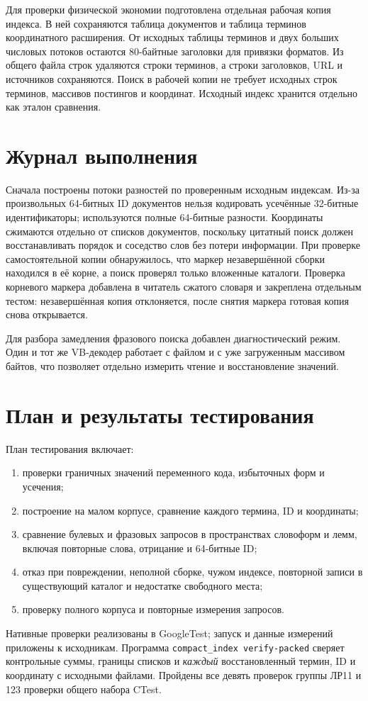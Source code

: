 \documentclass[12pt,a4paper]{article}
\begin{document}
Для проверки физической экономии подготовлена отдельная рабочая копия индекса.
В ней сохраняются таблица документов и таблица терминов координатного
расширения. От исходных таблицы терминов и двух больших числовых потоков
остаются 80-байтные заголовки для привязки форматов. Из общего файла строк
удаляются строки терминов, а строки заголовков, URL и источников сохраняются.
Поиск в рабочей копии не требует исходных строк терминов, массивов постингов
и координат. Исходный индекс хранится отдельно как эталон сравнения.

\section{Журнал выполнения}
Сначала построены потоки разностей по проверенным исходным индексам.
Из-за произвольных 64-битных ID документов нельзя кодировать усечённые
32-битные идентификаторы; используются полные 64-битные разности.
Координаты сжимаются отдельно от списков документов, поскольку цитатный поиск
должен восстанавливать порядок и соседство слов без потери информации.
При проверке самостоятельной копии обнаружилось, что маркер незавершённой
сборки находился в её корне, а поиск проверял только вложенные каталоги.
Проверка корневого маркера добавлена в читатель сжатого словаря и закреплена
отдельным тестом: незавершённая копия отклоняется, после снятия маркера
готовая копия снова открывается.

Для разбора замедления фразового поиска добавлен диагностический режим.
Один и тот же VB-декодер работает с файлом и с уже загруженным массивом байтов,
что позволяет отдельно измерить чтение и восстановление значений.

\section{План и результаты тестирования}

План тестирования включает:
\begin{enumerate}
\item проверки граничных значений переменного кода, избыточных форм и усечения;
\item построение на малом корпусе, сравнение каждого термина, ID и координаты;
\item сравнение булевых и фразовых запросов в пространствах словоформ и лемм,
включая повторные слова, отрицание и 64-битные ID;
\item отказ при повреждении, неполной сборке, чужом индексе, повторной записи
в существующий каталог и недостатке свободного места;
\item проверку полного корпуса и повторные измерения запросов.
\end{enumerate}
Нативные проверки реализованы в GoogleTest; запуск и данные измерений приложены
к исходникам. Программа \texttt{compact\_index verify-packed} сверяет контрольные
суммы, границы списков и \emph{каждый} восстановленный термин, ID и координату
с исходными файлами.
Пройдены все девять проверок группы ЛР11 и 123 проверки общего набора CTest.
\end{document}
